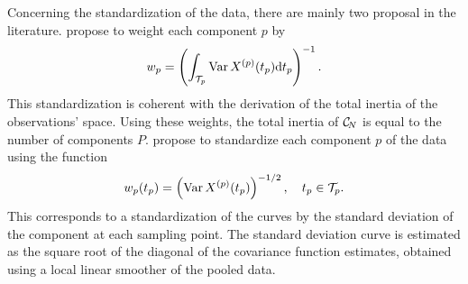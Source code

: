 Concerning the standardization of the data, there are mainly two proposal in the literature. \cite{happMultivariateFunctionalPrincipal2018a} propose to weight each component $p$ by
\begin{equation}
w_p = \left(\int_{\mathcal{T}_{p}} \operatorname{Var} X^{(p)}(t_p) {\rm d} t_p\right)^{-1}.
\end{equation}
This standardization is coherent with the derivation of the total inertia of the observations' space. Using these weights, the total inertia of $\mathcal{C}_{\!N}$ is equal to the number of components $P$. \cite{chiouMultivariateFunctionalPrincipal2014} propose to standardize each component $p$ of the data using the function
\begin{equation}
w_p(t_p) = \left(\operatorname{Var} X^{(p)}(t_p)\right)^{-1/2}, \quad t_p \in \mathcal{T}_{p}.
\end{equation}
This corresponds to a standardization of the curves by the standard deviation of the component at each sampling point. The standard deviation curve is estimated as the square root of the diagonal of the covariance function estimates, obtained using a local linear smoother of the pooled data. 



